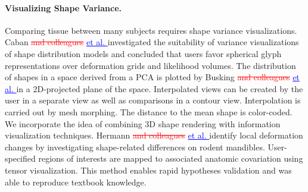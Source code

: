 \documentclass[journal]{style/vgtc} 			          %
\newcommand{\rem}[1]{\textcolor{red}{\sout{#1}}}
\newcommand{\add}[1]{\textcolor{blue}{\uline{#1}}}
\begin{document}
\paragraph{Visualizing Shape Variance.}
Comparing tissue between many subjects requires shape variance visualizations.
%
Caban \rem{and colleagues} \add{et al. \cite{Caban2011}} investigated the suitability of variance visualizations of shape distribution models and concluded that users favor spherical glyph representations over deformation grids and likelihood volumes.
%
The distribution of shapes in a space derived from a PCA is plotted by Busking \rem{and colleagues} \add{et al. \cite{Busking2010a}} in a 2D-projected plane of the space.
%
Interpolated views can be created by the user in a separate view as well as comparisons in a contour view.
%
Interpolation is carried out by mesh morphing.
%
The distance to the mean shape is color-coded.
%
We incorporate the idea of combining 3D shape rendering with information visualization techniques.
%
%
%
Hermann \rem{and colleagues} \add{et al. \cite{Hermann2014}} identify local deformation changes by investigating shape-related differences on rodent mandibles.
%
User-specified regions of interests are mapped to associated anatomic covariation using tensor visualization.
%
This method enables rapid hypotheses validation and was able to reproduce textbook knowledge.
%
%
%

\end{document}
